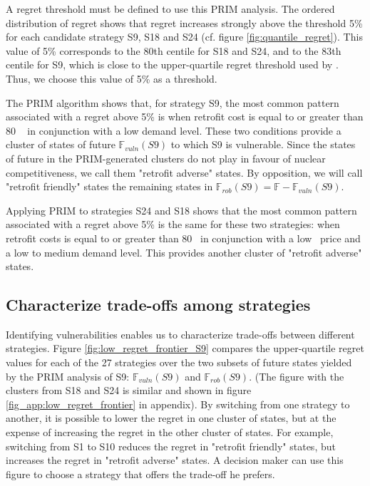 A regret threshold must be defined to use this PRIM analysis. The ordered distribution of regret shows that regret increases strongly above the threshold 5\% for each candidate strategy S9, S18 and S24 (cf. figure \ref{fig:quantile_regret}). This value of 5\% corresponds to the 80th centile for S18 and S24, and to the 83th centile for S9, which is close to the upper-quartile regret threshold used by \citet{Nahmmacher2016}. Thus, we choose this value of 5\% as a threshold. 

The PRIM algorithm shows that, for strategy S9, the most common pattern associated with a regret above 5\% is when retrofit cost is equal to or greater than 80 \emwh~ in conjunction with a low demand level. These two conditions provide a cluster of states of future $\mathbb{F}_{vuln}(S9)$ to which S9 is vulnerable. Since the states of future in the PRIM-generated clusters do not play in favour of nuclear competitiveness, we call them "retrofit adverse" states. By opposition, we will call "retrofit friendly" states the remaining states in $\mathbb{F}_{rob}(S9) = \mathbb{F} - \mathbb{F}_{vuln}(S9)$.  

Applying PRIM to strategies S24 and S18 shows that the most common pattern associated with a regret above 5\% is the same for these two strategies: when retrofit costs is equal to or greater than 80 \emwh\ in conjunction with a low \coo\ price and a low to medium demand level. This provides another cluster of "retrofit adverse" states.


\subsection{Characterize trade-offs among strategies}

Identifying vulnerabilities enables us to characterize trade-offs between different strategies. Figure \ref{fig:low_regret_frontier_S9} compares the upper-quartile regret values for each of the 27 strategies over the two subsets of future states yielded by the PRIM analysis of S9: $\mathbb{F}_{vuln}(S9)$ and $\mathbb{F}_{rob}(S9)$. (The figure with the clusters from S18 and S24 is similar and shown in figure \ref{fig_app:low_regret_frontier} in appendix).
By switching from one strategy to another, it is possible to lower the regret in one cluster of states, but at the expense of increasing the regret in the other cluster of states. For example, switching from S1 to S10 reduces the regret in "retrofit friendly" states, but increases the regret in "retrofit adverse" states. 
A decision maker can use this figure to choose a strategy that offers the trade-off he prefers. 

